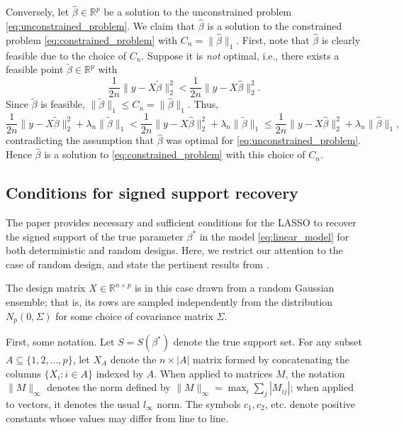 \documentclass[letterpaper,12pt]{article}
\newcommand{\norm}[1]{\lVert#1\rVert}
\begin{document}
Conversely, let $\hat{\beta} \in \mathbb{R}^p$ be a solution to the
unconstrained problem \eqref{eq:unconstrained_problem}. We claim that
$\hat{\beta}$ is a solution to the constrained problem
\eqref{eq:constrained_problem} with $C_n =
\norm{\hat{\beta}}_1$. First, note that $\hat{\beta}$ is clearly
feasible due to the choice of $C_n$. Suppose it is \emph{not} optimal,
i.e., there exists a feasible point $\tilde{\beta} \in \mathbb{R}^p$
with
\begin{equation*}
  \frac{1}{2n} \norm{y - X\tilde{\beta}}_2^2
    < \frac{1}{2n} \norm{y - X\hat{\beta}}_2^2.
\end{equation*}
Since $\tilde{\beta}$ is feasible,
$\norm{\tilde{\beta}}_1 \leq C_n = \norm{\hat{\beta}}_1$. Thus,
\begin{equation*}
  \frac{1}{2n} \norm{y - X\tilde{\beta}}_2^2 + \lambda_n \norm{\tilde{\beta}}_1
    < \frac{1}{2n} \norm{y - X\hat{\beta}}_2^2
      + \lambda_n \norm{\tilde{\beta}}_1
    \leq \frac{1}{2n} \norm{y - X\hat{\beta}}_2^2
      + \lambda_n \norm{\hat{\beta}}_1,
\end{equation*}
contradicting the assumption that $\hat{\beta}$ was optimal for
\eqref{eq:unconstrained_problem}. Hence $\hat{\beta}$ is a solution to
\eqref{eq:constrained_problem} with this choice of $C_n$.

\subsection*{Conditions for signed support recovery}

The paper \cite{wainwright06} provides necessary and sufficient
conditions for the LASSO to recover the signed support of the true
parameter $\beta^\ast$ in the model \eqref{eq:linear_model} for both
deterministic and random designs. Here, we restrict our attention to
the case of random design, and state the pertinent results from
\cite{wainwright06}.

The design matrix $X \in \mathbb{R}^{n \times p}$ is in this case
drawn from a random Gaussian ensemble; that is, its rows are sampled
independently from the distribution $N_p(0, \Sigma)$ for some choice
of covariance matrix $\Sigma$.

First, some notation. Let $S = S(\beta^\ast)$ denote the true support
set. For any subset $A \subseteq \{1, 2, \ldots, p\}$, let $X_A$
denote the $n \times |A|$ matrix formed by concatenating the columns
$\{X_i : i \in A\}$ indexed by $A$. When applied to matrices $M$, the
notation $\norm{M}_\infty$ denotes the norm defined by
$\norm{M}_\infty = \max_i \sum_j |M_{ij}|$; when applied to vectors,
it denotes the usual $l_\infty$ norm. The symbols $c_1, c_2$,
etc. denote positive constants whose values may differ from line to
line.
\end{document}
